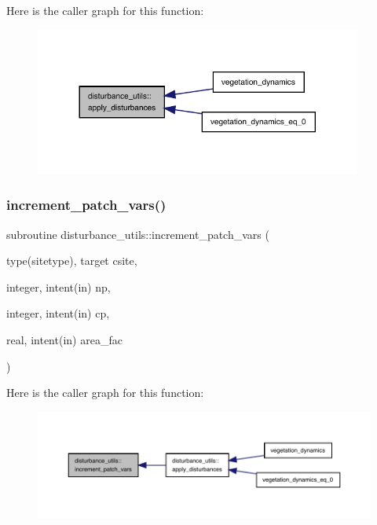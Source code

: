 Here is the caller graph for this function\+:
\nopagebreak
\begin{figure}[H]
\begin{center}
\leavevmode
\includegraphics[width=305pt]{namespacedisturbance__utils_a29d6db4e94463404643e5c3666c67767_icgraph}
\end{center}
\end{figure}
\mbox{\label{namespacedisturbance__utils_a60d031d31fcde31370f73cebaaaadb24}} 
\subsubsection{\texorpdfstring{increment\+\_\+patch\+\_\+vars()}{increment\_patch\_vars()}}
{\footnotesize\ttfamily subroutine disturbance\+\_\+utils\+::increment\+\_\+patch\+\_\+vars (\begin{DoxyParamCaption}\item[{type(sitetype), target}]{csite,  }\item[{integer, intent(in)}]{np,  }\item[{integer, intent(in)}]{cp,  }\item[{real, intent(in)}]{area\+\_\+fac }\end{DoxyParamCaption})}

Here is the caller graph for this function\+:
\nopagebreak
\begin{figure}[H]
\begin{center}
\leavevmode
\includegraphics[width=350pt]{namespacedisturbance__utils_a60d031d31fcde31370f73cebaaaadb24_icgraph}
\end{center}
\end{figure}
\mbox{\label{namespacedisturbance__utils_a31b6105dc67086438d6827bbffaf4bc4}} 
